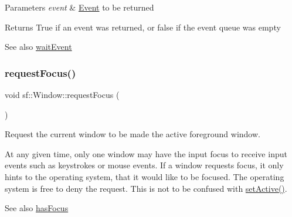 \begin{DoxyParams}{Parameters}
{\em event} & \mbox{\hyperlink{classsf_1_1_event}{Event}} to be returned\\
\hline
\end{DoxyParams}
\begin{DoxyReturn}{Returns}
True if an event was returned, or false if the event queue was empty
\end{DoxyReturn}
\begin{DoxySeeAlso}{See also}
\mbox{\hyperlink{classsf_1_1_window_aaf02ab64fbc1d374eef3696df54137bc}{wait\+Event}} \begin{DoxyVerb}\end{DoxyVerb}
 
\end{DoxySeeAlso}
\mbox{\label{classsf_1_1_window_a58cf7fa1775e8e7542032e3ecfa83b49}} 
\subsubsection{\texorpdfstring{requestFocus()}{requestFocus()}}
{\footnotesize\ttfamily void sf\+::\+Window\+::request\+Focus (\begin{DoxyParamCaption}{ }\end{DoxyParamCaption})}



Request the current window to be made the active foreground window. 

At any given time, only one window may have the input focus to receive input events such as keystrokes or mouse events. If a window requests focus, it only hints to the operating system, that it would like to be focused. The operating system is free to deny the request. This is not to be confused with \mbox{\hyperlink{classsf_1_1_window_aaab549da64cedf74fa6f1ae7a3cc79e0}{set\+Active()}}.

\begin{DoxySeeAlso}{See also}
\mbox{\hyperlink{classsf_1_1_window_ad8db2e6500d13ca9396281296404ba31}{has\+Focus}} \begin{DoxyVerb}\end{DoxyVerb}
 
\end{DoxySeeAlso}
\mbox{\label{classsf_1_1_window_aaab549da64cedf74fa6f1ae7a3cc79e0}} 
